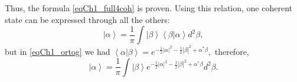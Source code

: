 Thus, the formula \eqref{eqCh1_full4coh} is proven. Using
this relation, one coherent state can be expressed through all
the others: 
\[
\left|\alpha\right> = \frac{1}{\pi}\int\left|\beta\right>\left<\beta\right|\left.\alpha\right> d^2 \beta,
\]
but in \eqref{eqCh1_ortog} we had
\(
\left<\alpha\right|\left.\beta\right> = 
e^{
-\frac{1}{2} \left|\alpha\right|^2  -\frac{1}{2} \left|\beta\right|^2
+
\alpha^{*} \beta
},
\)
therefore,
\begin{equation}
\left|\alpha\right> = \frac{1}{\pi}\int\left|\beta\right>
e^{
-\frac{1}{2} \left|\alpha\right|^2  -\frac{1}{2} \left|\beta\right|^2
+
\alpha^{*} \beta
} d^2 \beta.
\end{equation}